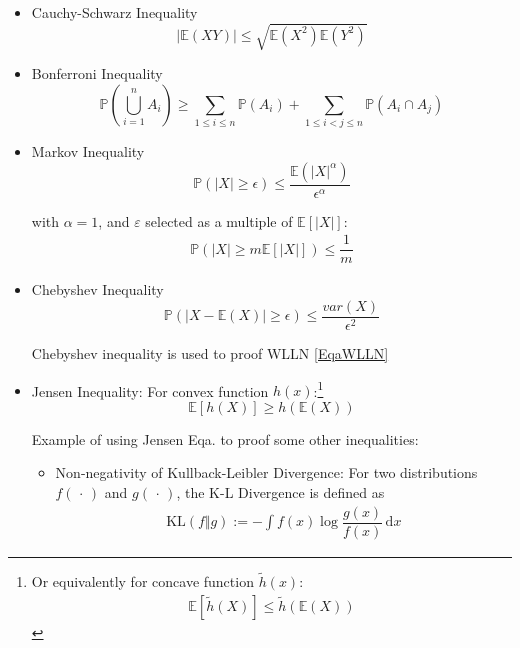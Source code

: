 \begin{itemize}
    \item Cauchy-Schwarz Inequality
    \begin{equation}
        \left\vert \mathbb{E}(XY) \right\vert\leq \sqrt{\mathbb{E}(X^2)\mathbb{E}(Y^2)}
    \end{equation}

    \item Bonferroni Inequality
\begin{equation}    \mathbb{P}(\bigcup_{i=1}^n A_i)\geq \sum_{1\leq i\leq n}  \mathbb{P}(A_i)+\sum_{1\leq i <j\leq n}  \mathbb{P}(A_i\cap A_j)
\end{equation}
    \item Markov Inequality
\begin{equation}     \mathbb{P}(|X|\geq \epsilon)\leq\frac{\mathbb{E}(|X|^\alpha)}{\epsilon^\alpha}
\end{equation}

    with $ \alpha =1 $, and $ \varepsilon  $ selected as a multiple of $ \mathbb{E}\left[ |X| \right]  $:
    \begin{align}
        \mathbb{P}\left( |X|\geq m\mathbb{E}\left[ |X| \right]  \right) \leq \dfrac{1}{m} 
    \end{align}
    
    
    \item Chebyshev Inequality
\begin{equation}     \mathbb{P}(|X-\mathbb{E}(X)|\geq\epsilon)\leq\frac{var(X)}{\epsilon^2}
\end{equation}

    Chebyshev inequality is used to proof WLLN \autoref{EqaWLLN}
    \item Jensen Inequality: For convex function $h(x)$:\footnote{Or equivalently for concave function $ \tilde{h}(x) $:
    \begin{align}
         \mathbb{E}[\tilde{h}(X)]\leq \tilde{h}(\mathbb{E}(X))
    \end{align}
    }
\begin{equation}    \mathbb{E}[h(X)]\geq h(\mathbb{E}(X))
\end{equation}
    
    Example of using Jensen Eqa. to proof some other inequalities:
    \begin{itemize}[topsep=2pt,itemsep=0pt]
        \item Non-negativity of Kullback-Leibler Divergence: For two distributions $ f(\, \cdot \, ) $ and $ g(\, \cdot \, ) $, the K-L Divergence is defined as 
        \begin{align}
            \mathrm{KL}(f\Vert g):=-\int f(x)\log \dfrac{g(x)}{f(x)}  \,\mathrm{d}x
        \end{align}
        

\end{itemize}
\end{itemize}
